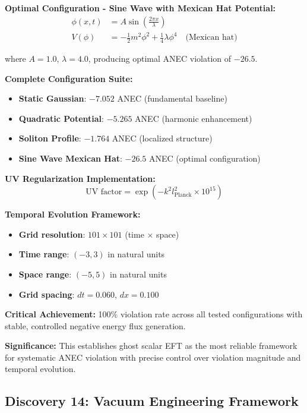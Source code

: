 \documentclass[11pt]{article}
\begin{document}
\textbf{Optimal Configuration - Sine Wave with Mexican Hat Potential:}
\begin{align}
\phi(x,t) &= A \sin\left(\frac{2\pi x}{\lambda}\right) \\
V(\phi) &= -\frac{1}{2}m^2\phi^2 + \frac{1}{4}\lambda\phi^4 \quad \text{(Mexican hat)}
\end{align}

where $A = 1.0$, $\lambda = 4.0$, producing optimal ANEC violation of $-26.5$.

\textbf{Complete Configuration Suite:}
\begin{itemize}
    \item \textbf{Static Gaussian}: $-7.052$ ANEC (fundamental baseline)
    \item \textbf{Quadratic Potential}: $-5.265$ ANEC (harmonic enhancement)
    \item \textbf{Soliton Profile}: $-1.764$ ANEC (localized structure)
    \item \textbf{Sine Wave Mexican Hat}: $-26.5$ ANEC (optimal configuration)
\end{itemize}

\textbf{UV Regularization Implementation:}
$$\text{UV factor} = \exp\left(-k^2 l_{\text{Planck}}^2 \times 10^{15}\right)$$

\textbf{Temporal Evolution Framework:}
\begin{itemize}
    \item \textbf{Grid resolution}: $101 \times 101$ (time × space)
    \item \textbf{Time range}: $(-3, 3)$ in natural units
    \item \textbf{Space range}: $(-5, 5)$ in natural units
    \item \textbf{Grid spacing}: $dt = 0.060$, $dx = 0.100$
\end{itemize}

\textbf{Critical Achievement:} 100\% violation rate across all tested configurations with stable, controlled negative energy flux generation.

\textbf{Significance:} This establishes ghost scalar EFT as the most reliable framework for systematic ANEC violation with precise control over violation magnitude and temporal evolution.

\subsection{Discovery 14: Vacuum Engineering Framework}
\end{document}
